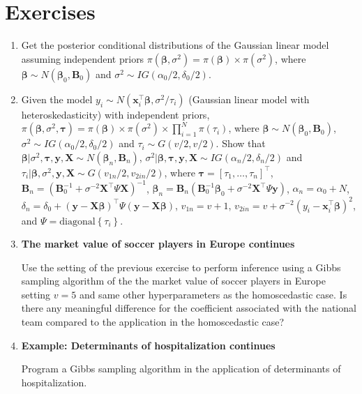 \section{Exercises}\label{sec612}

\begin{enumerate}
	\item Get the posterior conditional distributions of the Gaussian linear model assuming independent priors $\pi(\bm{\beta},\sigma^2)=\pi(\bm{\beta})\times\pi(\sigma^2)$, where $\bm{\beta} \sim N(\bm{\beta}_0, {\bm{B}}_0)$ and $\sigma^2 \sim IG(\alpha_0/2, \delta_0/2)$.
	
	\item Given the model $y_i\sim N({\bm{x}}_i^{\top}\bm{\beta}, \sigma^2/\tau_i)$ (Gaussian linear model with heteroskedasticity) with independent priors,  $\pi(\bm{\beta},\sigma^2,\bm{\tau})=\pi(\bm{\beta})\times\pi(\sigma^2)\times\prod_{i=1}^N\pi(\tau_i)$, where $\bm{\beta} \sim N(\bm{\beta}_0, {\bm{B}}_0)$, $\sigma^2 \sim IG(\alpha_0/2, \delta_0/2)$ and $\tau_i\sim G(v/2,v/2)$. Show that $\bm{\beta}|\sigma^2,\bm{\tau},{\bm{y}},{\bm{X}}\sim N(\bm{\beta}_n,{\bm{B}}_n)$, $\sigma^2|\bm{\beta},\bm{\tau},{\bm{y}},{\bm{X}}\sim IG(\alpha_n/2,\delta_n/2)$ and $\tau_i|\bm{\beta},\sigma^2,{\bm{y}},{\bm{X}}\sim G(v_{1n}/2,v_{2in}/2)$, where $\bm{\tau}=[\tau_1,\dots,\tau_n]^{\top}$, ${\bm{B}}_n=({\bm{B}}_0^{-1}+\sigma^{-2}{{\bm{X}}}^{\top}\Psi{{\bm{X}}})^{-1}$, $\bm{\beta}_n={\bm{B}}_n({\bm{B}}_0^{-1}\bm{\beta}_0+\sigma^{-2}{\bm{X}}^{\top}\Psi{\bm{y}})$, $\alpha_n=\alpha_0+N$, $\delta_n=\delta_0+({\bm{y}}-{\bm{X}}\bm{\beta})^{\top}\Psi({\bm{y}}-{\bm{X}}\bm{\beta})$, $v_{1n}=v+1$, $v_{2in}=v+\sigma^{-2}(y_i-{\bm{x}}_i^{\top}\bm{\beta})^2$, and $\Psi=\text{diagonal}\left\{\tau_i\right\}$.
		
	\item \textbf{The market value of soccer players in Europe continues}
	
	Use the setting of the previous exercise to perform inference using a Gibbs sampling algorithm of the the market value of soccer players in Europe setting $v=5$ and same other hyperparameters as the homoscedastic case. Is there any meaningful difference for the coefficient associated with the national team compared to the application in the homoscedastic case?
	
	\item \textbf{Example: Determinants of hospitalization continues}
	
	Program a Gibbs sampling algorithm in the application of determinants of hospitalization.
	

\end{enumerate}

